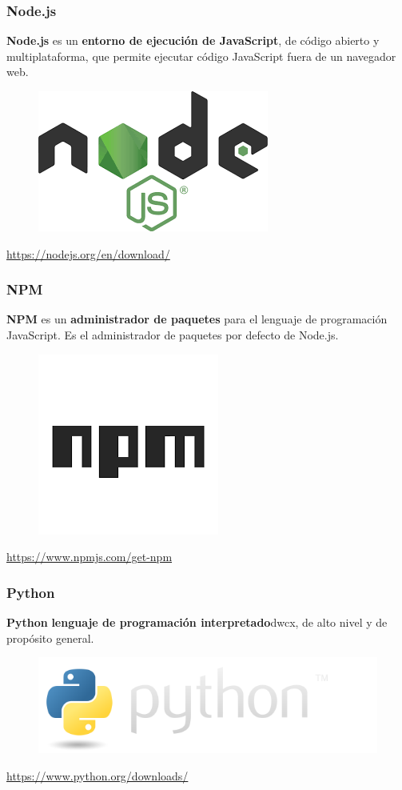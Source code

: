 \documentclass{beamer}
\begin{document}
	\begin{frame}
		\frametitle{Node.js}
		\textbf{Node.js} es un \textbf{entorno de ejecución de JavaScript}, de código abierto y multiplataforma, que permite ejecutar código JavaScript fuera de un navegador web.
		\begin{figure}[h]
			\includegraphics[scale=.3]{nodejs}
			\centering
		\end{figure}
		\begin{center}
			\tiny{\url{https://nodejs.org/en/download/}}
		\end{center}
	\end{frame}
	
	\begin{frame}
		\frametitle{NPM}
		\textbf{NPM} es un \textbf{administrador de paquetes} para el lenguaje de programación JavaScript. Es el administrador de paquetes por defecto de Node.js.
		\begin{figure}[h]
			\includegraphics[scale=.3]{npm}
			\centering
		\end{figure}
		\begin{center}
			\tiny{\url{https://www.npmjs.com/get-npm}}
		\end{center}
	\end{frame}
	
	\begin{frame}
		\frametitle{Python}
		\textbf{Python} \textbf{lenguaje de programación interpretado}dwcx, de alto nivel y de propósito general.
		\begin{figure}[h]
			\includegraphics[scale=.3]{python}
			\centering
		\end{figure}
		\begin{center}
			\tiny{\url{https://www.python.org/downloads/}}
		\end{center}
	\end{frame}
\end{document}
